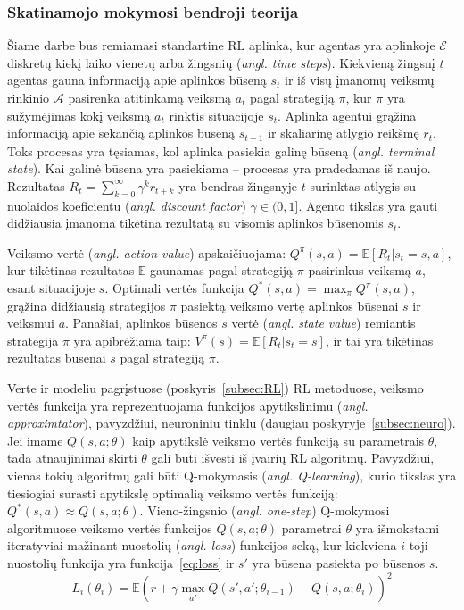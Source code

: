 \documentclass{VUMIFPSbakalaurinis}
\begin{document}
\subsubsection{Skatinamojo mokymosi bendroji teorija} \label{subsubsec:rlTeorija} 
{
	Šiame darbe bus remiamasi standartine RL aplinka, kur agentas yra aplinkoje \(\mathcal{E}\) diskretų kiekį laiko vienetų arba žingsnių (\textit{angl. time steps}). Kiekvieną žingsnį \(t\) agentas gauna informaciją apie aplinkos būseną \(s_t\) ir iš visų įmanomų veiksmų rinkinio \(\mathcal{A}\) pasirenka atitinkamą veiksmą \(a_t\) pagal strategiją \(\pi\), kur \(\pi\) yra sužymėjimas kokį veiksmą \(a_t\) rinktis situacijoje \(s_t\). Aplinka agentui grąžina informaciją apie sekančią aplinkos būseną \(s_{t+1}\) ir skaliarinę atlygio reikšmę \(r_t\). Toks procesas yra tęsiamas, kol aplinka pasiekia galinę būseną (\textit{angl. terminal state}). Kai galinė būsena yra pasiekiama -- procesas yra pradedamas iš naujo. Rezultatas \(R_t = \sum_{k=0}^{\infty} \gamma^k r_{t+k}\) yra bendras žingsnyje \(t\) surinktas atlygis su nuolaidos koeficientu (\textit{angl. discount factor}) \(\gamma \in (0, 1] \). Agento tikslas yra gauti didžiausia įmanoma tikėtina rezultatą su visomis aplinkos būsenomis \(s_t\).\par
	
	Veiksmo vertė (\textit{angl. action value}) apskaičiuojama: \(Q^{\pi}(s, a) = \mathbb{E}[R_t|s_t = s, a] \), kur tikėtinas rezultatas \(\mathbb{E}\) gaunamas pagal strategiją \(\pi\) pasirinkus veiksmą \(a\), esant situacijoje \(s\). Optimali vertės funkcija \(Q^*(s, a) = \max_{\pi}Q^{\pi}(s, a)\), grąžina didžiausią strategijos \(\pi\) pasiektą veiksmo vertę aplinkos būsenai \(s\) ir veiksmui \(a\). Panašiai, aplinkos būsenos \(s\) vertė (\textit{angl. state value}) remiantis strategija \(\pi\) yra apibrėžiama taip: \(V^{\pi}(s) = \mathbb{E}[R_t|s_t = s] \), ir tai yra tikėtinas rezultatas būsenai \(s\) pagal strategiją \(\pi\).\par
	
	Verte ir modeliu pagrįstuose (poskyris~\ref{subsec:RL}) RL metoduose, veiksmo vertės funkcija yra reprezentuojama funkcijos apytikslinimu (\textit{angl. approximtator}), pavyzdžiui, neuroniniu tinklu (daugiau poskyryje~\ref{subsec:neuro}). Jei imame \(Q(s, a; \theta)\) kaip apytikslė veiksmo vertės funkciją su parametrais \(\theta\), tada atnaujinimai skirti \(\theta\) gali būti išvesti iš įvairių RL algoritmų. Pavyzdžiui, vienas tokių algoritmų gali būti Q-mokymasis (\textit{angl. Q-learning}), kurio tikslas yra tiesiogiai surasti apytikslę optimalią veiksmo vertės funkciją: \(Q^*(s, a) \approx Q(s, a; \theta)\). Vieno-žingsnio (\textit{angl. one-step}) Q-mokymosi algoritmuose veiksmo vertės funkcijos \(Q(s, a; \theta)\) parametrai \(\theta\) yra išmokstami iteratyviai mažinant nuostolių (\textit{angl. loss}) funkcijos seką, kur kiekviena \(i\)-toji nuostolių funkcija yra funkcija~\ref{eq:loss} ir \(s'\) yra būsena pasiekta po būsenos \(s\).
	\begin{equation}\label{eq:loss}
		L_i(\theta_i) = \mathbb{E} \left( r + \gamma \max_{a'} Q(s', a'; \theta_{i-1}) - Q(s, a; \theta_i) \right)^2
	\end{equation}
	
}
\end{document}
